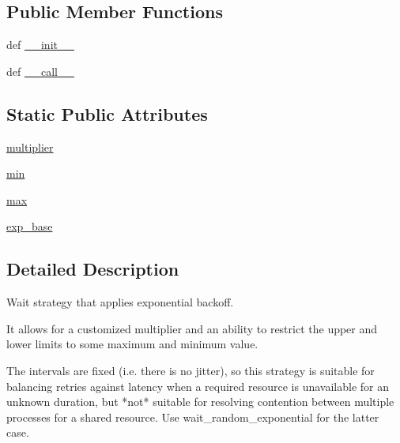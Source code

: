 \subsection*{Public Member Functions}
\begin{DoxyCompactItemize}
\item 
def \hyperlink{classpip_1_1__vendor_1_1tenacity_1_1wait_1_1wait__exponential_ad4c1bf3a33d98f44fd34d96ac65a923f}{\+\_\+\+\_\+init\+\_\+\+\_\+}
\item 
def \hyperlink{classpip_1_1__vendor_1_1tenacity_1_1wait_1_1wait__exponential_a1731d7c9e7cee5039fdbaae5109a5126}{\+\_\+\+\_\+call\+\_\+\+\_\+}
\end{DoxyCompactItemize}
\subsection*{Static Public Attributes}
\begin{DoxyCompactItemize}
\item 
\hyperlink{classpip_1_1__vendor_1_1tenacity_1_1wait_1_1wait__exponential_aad2e12fc1f18347de41ac288fa9d55f4}{multiplier}
\item 
\hyperlink{classpip_1_1__vendor_1_1tenacity_1_1wait_1_1wait__exponential_ae41e1cde724cc3efb75190fd8d02b403}{min}
\item 
\hyperlink{classpip_1_1__vendor_1_1tenacity_1_1wait_1_1wait__exponential_a684008195b1733ae7520a10d8183fe9b}{max}
\item 
\hyperlink{classpip_1_1__vendor_1_1tenacity_1_1wait_1_1wait__exponential_af64e5448868f6376b326c38a958f3c34}{exp\+\_\+base}
\end{DoxyCompactItemize}


\subsection{Detailed Description}
\begin{DoxyVerb}Wait strategy that applies exponential backoff.

It allows for a customized multiplier and an ability to restrict the
upper and lower limits to some maximum and minimum value.

The intervals are fixed (i.e. there is no jitter), so this strategy is
suitable for balancing retries against latency when a required resource is
unavailable for an unknown duration, but *not* suitable for resolving
contention between multiple processes for a shared resource. Use
wait_random_exponential for the latter case.
\end{DoxyVerb}
 

